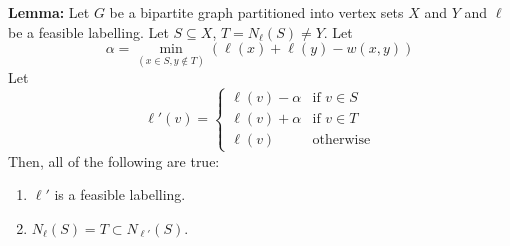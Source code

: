 \documentclass[12pt]{article}
\newcommand{\lemma}{\noindent \textbf{Lemma: }}
\newcommand{\lskip}{\vspace{\baselineskip}}
\begin{document}
\lemma Let $G$ be a bipartite graph partitioned into vertex sets $X$ and $Y$ and $\ell$ be a feasible labelling. Let $S \subseteq X$, $T = N_\ell(S) \neq Y$. Let \[ \alpha = \min_{(x \in S, y \notin T)} (\ell(x) + \ell(y) - w(x,y)) \]
Let
\[ \ell'(v) =
  \begin{cases}
    \ell(v) - \alpha & \text{if } v \in S \\
    \ell(v) + \alpha & \text{if } v \in T \\
    \ell(v) & \text{otherwise}
  \end{cases}
\]
Then, all of the following are true:
\begin{enumerate}
  \item $\ell'$ is a feasible labelling.
  \item $N_\ell(S) = T \subset N_{\ell'}(S)$.
\end{enumerate}
\lskip
\end{document}
